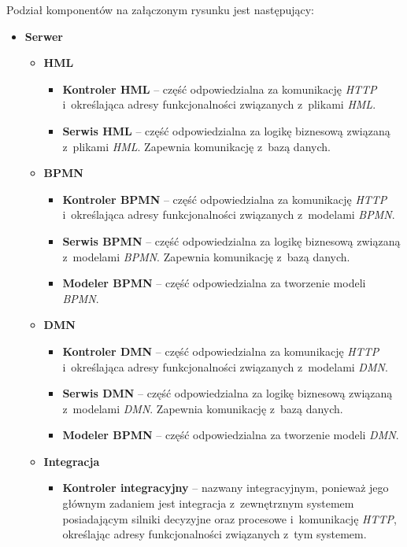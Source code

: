 Podział komponentów na załączonym rysunku jest następujący:
\begin{itemize}
    \item \textbf{Serwer} 
        \begin{itemize}
            \item \textbf{HML}
                \begin{itemize}
                    \item \textbf{Kontroler HML} -- część odpowiedzialna za komunikację \emph{HTTP} i~określająca adresy funkcjonalności związanych z~plikami \emph{HML}.
                    \item \textbf{Serwis HML} -- część odpowiedzialna za logikę biznesową związaną z~plikami \emph{HML}. Zapewnia komunikację z~bazą danych.
                \end{itemize}
            \item \textbf{BPMN}
                \begin{itemize}
                    \item \textbf{Kontroler BPMN} -- część odpowiedzialna za komunikację \emph{HTTP} i~określająca adresy funkcjonalności związanych z~modelami \emph{BPMN}.
                    \item \textbf{Serwis BPMN} -- część odpowiedzialna za logikę biznesową związaną z~modelami \emph{BPMN}. Zapewnia komunikację z~bazą danych.
                    \item \textbf{Modeler BPMN} -- część odpowiedzialna za tworzenie modeli \emph{BPMN}.
                \end{itemize}
            \item \textbf{DMN}
                \begin{itemize}
                    \item \textbf{Kontroler DMN} -- część odpowiedzialna za komunikację \emph{HTTP} i~określająca adresy funkcjonalności związanych z~modelami \emph{DMN}.
                    \item \textbf{Serwis DMN} -- część odpowiedzialna za logikę biznesową związaną z~modelami \emph{DMN}. Zapewnia komunikację z~bazą danych.
                    \item \textbf{Modeler BPMN} -- część odpowiedzialna za tworzenie modeli \emph{DMN}.
                \end{itemize}
            \item \textbf{Integracja}
                \begin{itemize}
                    \item \textbf{Kontroler integracyjny} -- nazwany integracyjnym, ponieważ jego głównym zadaniem jest integracja z~zewnętrznym systemem posiadającym silniki decyzyjne oraz procesowe i~komunikację \emph{HTTP}, określając adresy funkcjonalności związanych z~tym systemem.

\end{itemize}
\end{itemize}
\end{itemize}
